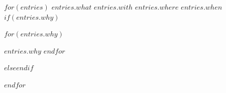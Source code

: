 \begin{cventries}
$for(entries)$
  \cventry
    {$entries.what$} %
    {$entries.with$} %
    {$entries.where$} %
    {$entries.when$} %
    $if(entries.why)${
      \begin{cvitems} %
$for(entries.why)$        \item {$entries.why$}
$endfor$      \end{cvitems}
    }$else${}$endif$

$endfor$
\end{cventries}
